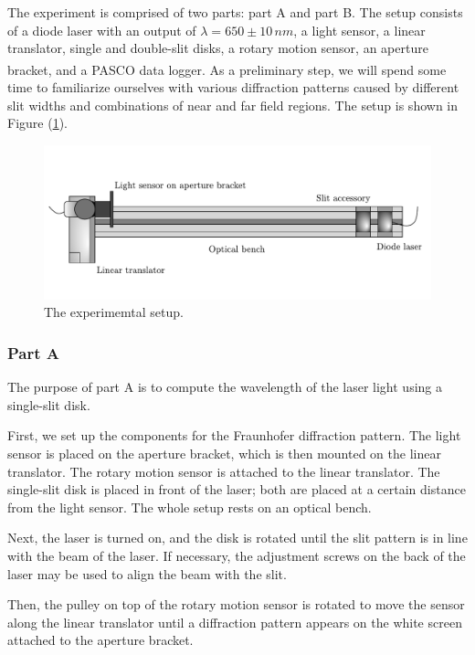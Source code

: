 \documentclass[10pt]{article}
\begin{document}
The experiment is comprised of two parts: part A and part B. The setup consists of a diode laser with an output of $\lambda = 650 \pm 10\,\unit{nm}$, a light sensor, a linear translator, single and double-slit disks, a rotary motion sensor, an aperture bracket, and a PASCO{\textsuperscript\textregistered} data logger. As a preliminary step, we will spend some time to familiarize ourselves with various diffraction patterns caused by different slit widths and combinations of near and far field regions. The setup is shown in Figure (\ref{fig:1}).

\begin{figure}[ht]
  \centering
  \includegraphics[scale=0.6]{figures/f1.pdf}
  \caption{The experimemtal setup.}
  \label{fig:1}
\end{figure}

\subsubsection*{Part A}

The purpose of part A is to compute the wavelength of the laser light using a single-slit disk.

First, we set up the components for the Fraunhofer diffraction pattern. The light sensor is placed on the aperture bracket, which is then mounted on the linear translator. The rotary motion sensor is attached to the linear translator. The single-slit disk is placed in front of the laser; both are placed at a certain distance from the light sensor. The whole setup rests on an optical bench.

Next, the laser is turned on, and the disk is rotated until the slit pattern is in line with the beam of the laser. If necessary, the adjustment screws on the back of the laser may be used to align the beam with the slit. 

Then, the pulley on top of the rotary motion sensor is rotated to move the sensor along the linear translator until a diffraction pattern appears on the white screen attached to the aperture bracket. 
\end{document}
